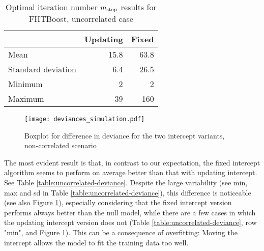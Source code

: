 \begin{table}
\caption{Optimal iteration number $m_{\text{stop}}$ results for FHTBoost, uncorrelated case}
\label{table:uncorrelated-mstop}
\centering
\begin{tabular}{l|rr}
\toprule
& Updating & Fixed \\
\hline
Mean               &  15.8  &  63.8  \\
Standard deviation &   6.4  &  26.5  \\
Minimum            &     2  &     2  \\
Maximum            &    39  &   160  \\
\bottomrule
\end{tabular}
\end{table}

\begin{figure}
\caption{Boxplot for difference in deviance for the two intercept variants, non-correlated scenario}
\label{fig:simulation-uncorrelated-deviances-boxplot}
\centering
\texttt{[image: deviances\_simulation.pdf]}
\end{figure}

The most evident result is that, in contrast to our expectation, the fixed intercept algorithm seems to perform on average better than that with updating intercept.
See Table \ref{table:uncorrelated-deviance}.
Despite the large variability (see min, max and sd in Table \ref{table:uncorrelated-deviance}), this difference is noticeable (see also Figure \ref{fig:simulation-uncorrelated-deviances-boxplot}), especially considering that the fixed intercept version performs always better than the null model, while there are a few cases in which the updating intercept version does not (Table \ref{table:uncorrelated-deviance}, row "min", and Figure \ref{fig:simulation-uncorrelated-deviances-boxplot}).
This can be a consequence of overfitting:
Moving the intercept allows the model to fit the training data too well.


